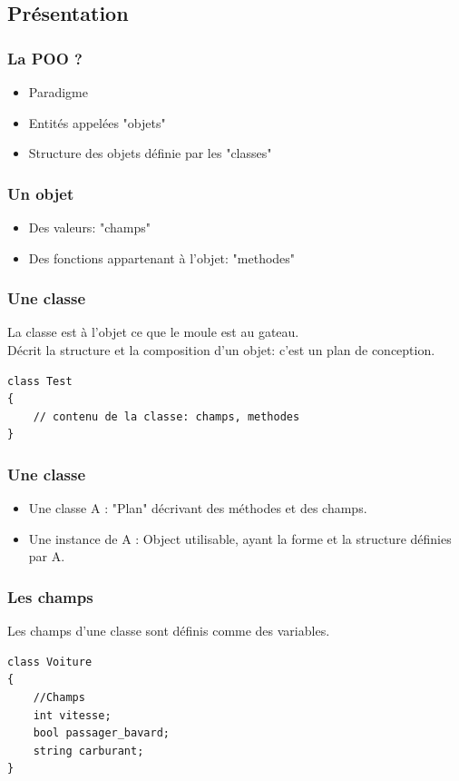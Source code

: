 \documentclass{beamer}
\begin{document}
\subsection{Présentation}

\begin{frame}
\frametitle{La POO ?}
\begin{itemize}
\item Paradigme
\item Entités appelées "objets"
\item Structure des objets définie par les "classes"
\end{itemize}
\end{frame}

\begin{frame}
\frametitle{Un objet}
\begin{itemize}
\item Des valeurs: "champs"
\item Des fonctions appartenant à l'objet: "methodes"
\end{itemize}
\end{frame}

\begin{frame}[fragile]
\frametitle{Une classe}
La classe est à l'objet ce que le moule est au gateau.\\
Décrit la structure et la composition d'un objet: c'est un plan de conception.
\begin{lstlisting}
class Test
{
    // contenu de la classe: champs, methodes
}
\end{lstlisting}
\end{frame}

\begin{frame}
\frametitle{Une classe}
\begin{itemize}
\item Une classe A : "Plan" décrivant des méthodes et des champs.
\item Une instance de A : Object utilisable, ayant la forme et la structure définies par A.
\end{itemize}
\end{frame}

\begin{frame}[fragile]
\frametitle{Les champs}
Les champs d'une classe sont définis comme des variables.
\begin{lstlisting}
class Voiture
{
    //Champs
    int vitesse;
    bool passager_bavard;
    string carburant;
}
\end{lstlisting}
\end{frame}
\end{document}
